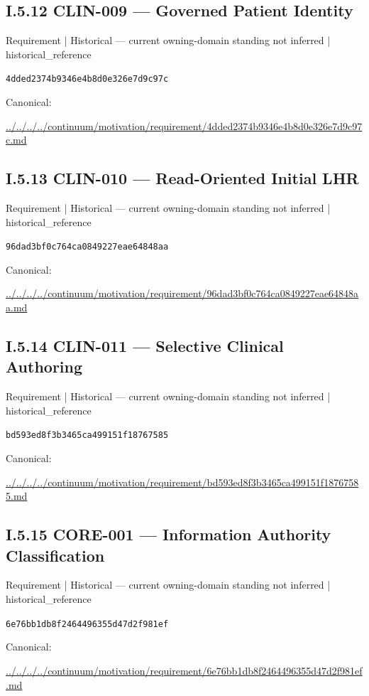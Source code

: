\documentclass[10pt,a4paper]{article}
\begin{document}
\subsection*{I.5.12 CLIN-009 — Governed Patient Identity}
\label{element-4dded2374b9346e4b8d0e326e7d9c97c}
{\small Requirement | Historical — current owning-domain standing not inferred | historical\_reference}\par
\texttt{4dded2374b9346e4b8d0e326e7d9c97c}\par
Canonical: \par
{\footnotesize\url{../../../../continuum/motivation/requirement/4dded2374b9346e4b8d0e326e7d9c97c.md}}\par
\subsection*{I.5.13 CLIN-010 — Read-Oriented Initial LHR}
\label{element-96dad3bf0c764ca0849227eae64848aa}
{\small Requirement | Historical — current owning-domain standing not inferred | historical\_reference}\par
\texttt{96dad3bf0c764ca0849227eae64848aa}\par
Canonical: \par
{\footnotesize\url{../../../../continuum/motivation/requirement/96dad3bf0c764ca0849227eae64848aa.md}}\par
\subsection*{I.5.14 CLIN-011 — Selective Clinical Authoring}
\label{element-bd593ed8f3b3465ca499151f18767585}
{\small Requirement | Historical — current owning-domain standing not inferred | historical\_reference}\par
\texttt{bd593ed8f3b3465ca499151f18767585}\par
Canonical: \par
{\footnotesize\url{../../../../continuum/motivation/requirement/bd593ed8f3b3465ca499151f18767585.md}}\par
\subsection*{I.5.15 CORE-001 — Information Authority Classification}
\label{element-6e76bb1db8f2464496355d47d2f981ef}
{\small Requirement | Historical — current owning-domain standing not inferred | historical\_reference}\par
\texttt{6e76bb1db8f2464496355d47d2f981ef}\par
Canonical: \par
{\footnotesize\url{../../../../continuum/motivation/requirement/6e76bb1db8f2464496355d47d2f981ef.md}}\par
\end{document}
